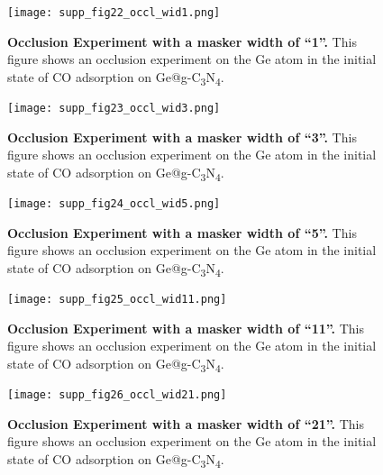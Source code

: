 \begin{figure}[htbp]
  \centering
  \texttt{[image: supp\_fig22\_occl\_wid1.png]}
  \caption{\textbf{Occlusion Experiment with a masker width of ``1''.}
  This figure shows an occlusion experiment on the Ge atom in
  the initial state of CO adsorption on Ge@g-C\textsubscript{3}N\textsubscript{4}.}
  \label{supp_fig22:occl_wid1}
\end{figure}

\begin{figure}[htbp]
  \centering
  \texttt{[image: supp\_fig23\_occl\_wid3.png]}
  \caption{\textbf{Occlusion Experiment with a masker width of ``3''.}
  This figure shows an occlusion experiment on the Ge atom in
  the initial state of CO adsorption on Ge@g-C\textsubscript{3}N\textsubscript{4}.}
  \label{supp_fig23:occl_wid3}
\end{figure}

\begin{figure}[htbp]
  \centering
  \texttt{[image: supp\_fig24\_occl\_wid5.png]}
  \caption{\textbf{Occlusion Experiment with a masker width of ``5''.}
  This figure shows an occlusion experiment on the Ge atom in
  the initial state of CO adsorption on Ge@g-C\textsubscript{3}N\textsubscript{4}.}
  \label{supp_fig24:occl_wid5}
\end{figure}

\begin{figure}[htbp]
  \centering
  \texttt{[image: supp\_fig25\_occl\_wid11.png]}
  \caption{\textbf{Occlusion Experiment with a masker width of ``11''.}
  This figure shows an occlusion experiment on the Ge atom in
  the initial state of CO adsorption on Ge@g-C\textsubscript{3}N\textsubscript{4}.}
  \label{supp_fig25:occl_wid11}
\end{figure}

\begin{figure}[htbp]
  \centering
  \texttt{[image: supp\_fig26\_occl\_wid21.png]}
  \caption{\textbf{Occlusion Experiment with a masker width of ``21''.}
  This figure shows an occlusion experiment on the Ge atom in
  the initial state of CO adsorption on Ge@g-C\textsubscript{3}N\textsubscript{4}.}
  \label{supp_fig26:occl_wid21}
\end{figure}


